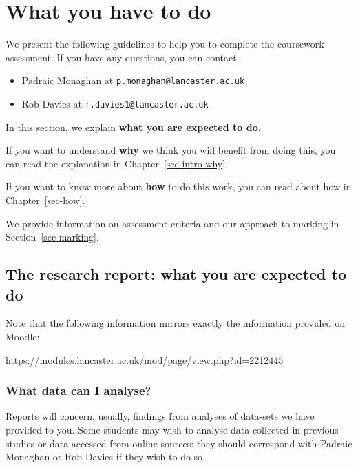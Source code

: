 \documentclass[
  letterpaper,
  DIV=11,
  numbers=noendperiod]{scrreprt}
\providecommand{\tightlist}{%
  \setlength{\itemsep}{0pt}\setlength{\parskip}{0pt}}\usepackage{longtable,booktabs,array}
\begin{document}

\hypertarget{sec-what}{%
\chapter{What you have to do}\label{sec-what}}

We present the following guidelines to help you to complete the
coursework assessment. If you have any questions, you can contact:

\begin{itemize}
\tightlist
\item
  Padraic Monaghan at \texttt{p.monaghan@lancaster.ac.uk}
\item
  Rob Davies at \texttt{r.davies1@lancaster.ac.uk}
\end{itemize}

In this section, we explain \textbf{what you are expected to do}.

If you want to understand \textbf{why} we think you will benefit from
doing this, you can read the explanation in Chapter~\ref{sec-intro-why}.

If you want to know more about \textbf{how} to do this work, you can
read about how in Chapter~\ref{sec-how}.

We provide information on assessment criteria and our approach to
marking in Section~\ref{sec-marking}.

\hypertarget{sec-what-expected}{%
\section{The research report: what you are expected to
do}\label{sec-what-expected}}

Note that the following information mirrors exactly the information
provided on Moodle:

\url{https://modules.lancaster.ac.uk/mod/page/view.php?id=2212445}

\hypertarget{sec-what-data}{%
\subsection{What data can I analyse?}\label{sec-what-data}}

Reports will concern, usually, findings from analyses of data-sets we
have provided to you. Some students may wish to analyse data collected
in previous studies or data accessed from online sources: they should
correspond with Padraic Monaghan or Rob Davies if they wish to do so.
\end{document}

